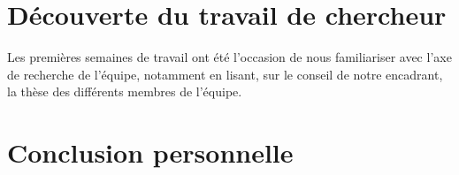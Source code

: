 \documentclass[12pt,a4paper,utf8x,titlepage]{article}
\begin{document}
\section{Découverte du travail de chercheur}
Les premières semaines de travail ont été l'occasion de nous familiariser avec l'axe de recherche de l'équipe, notamment en lisant, sur le conseil de notre encadrant, la thèse des différents membres de l'équipe.

\section{Conclusion personnelle}

\clearpage



\end{document}
